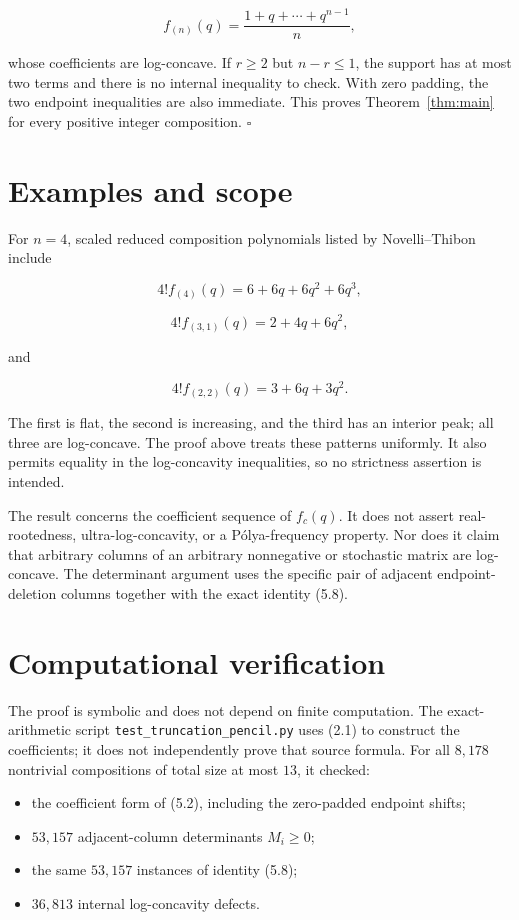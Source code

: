 \documentclass[11pt]{article}
\begin{document}
\[
f_{(n)}(q)=\frac{1+q+\cdots+q^{n-1}}{n},
\]

whose coefficients are log-concave. If $r\geq2$ but $n-r\leq1$, the support has at most two terms
and there is no internal inequality to check. With zero padding, the two endpoint inequalities are
also immediate. This proves Theorem~\ref{thm:main} for every positive integer composition.
\hfill$\square$


\section{Examples and scope}


For $n=4$, scaled reduced composition polynomials listed by Novelli--Thibon include

\[
4!f_{(4)}(q)=6+6q+6q^2+6q^3,
\]

\[
4!f_{(3,1)}(q)=2+4q+6q^2,
\]

and

\[
4!f_{(2,2)}(q)=3+6q+3q^2.
\]

The first is flat, the second is increasing, and the third has an interior peak; all three are
log-concave. The proof above treats these patterns uniformly. It also permits equality in the
log-concavity inequalities, so no strictness assertion is intended.

The result concerns the coefficient sequence of $f_c(q)$. It does not assert real-rootedness,
ultra-log-concavity, or a Pólya-frequency property. Nor does it claim that arbitrary columns of an
arbitrary nonnegative or stochastic matrix are log-concave. The determinant argument uses the
specific pair of adjacent endpoint-deletion columns together with the exact identity (5.8).

\section{Computational verification}


The proof is symbolic and does not depend on finite computation. The exact-arithmetic script
\texttt{test\_truncation\_pencil.py} uses (2.1) to construct the coefficients; it does not independently
prove that source formula. For all $8{,}178$ nontrivial compositions of total size at most $13$,
it checked:

\begin{itemize}
\item the coefficient form of (5.2), including the zero-padded endpoint shifts;
\item $53{,}157$ adjacent-column determinants $M_i\geq0$;
\item the same $53{,}157$ instances of identity (5.8);
\item $36{,}813$ internal log-concavity defects.

\end{itemize}
\end{document}
